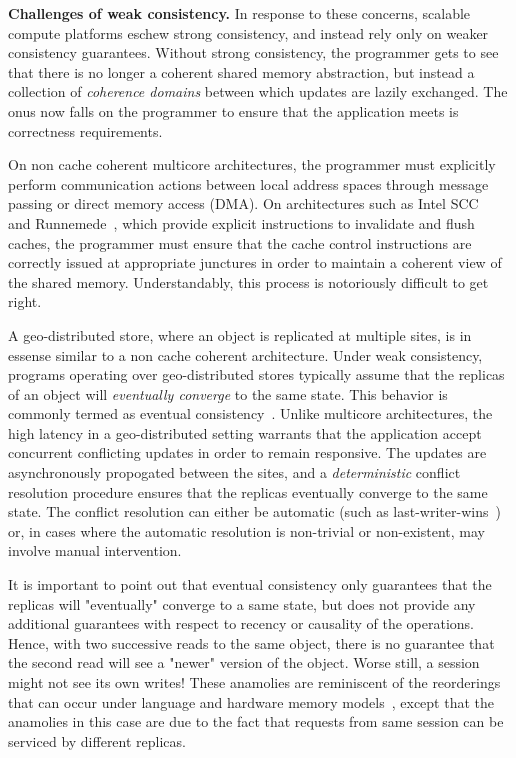\noindent \textbf{Challenges of weak consistency.} In response to these
concerns, scalable compute platforms eschew strong consistency, and instead
rely only on weaker consistency guarantees. Without strong consistency, the
programmer gets to see that there is no longer a coherent shared memory
abstraction, but instead a collection of \emph{coherence domains} between which
updates are lazily exchanged. The onus now falls on the programmer to ensure
that the application meets is correctness requirements.

On non cache coherent multicore architectures, the programmer must explicitly
perform communication actions between local address spaces through message
passing or direct memory access (DMA). On architectures such as Intel
SCC~\cite{Mattson2010} and Runnemede~\cite{Carter2013}, which provide explicit
instructions to invalidate and flush caches, the programmer must ensure that
the cache control instructions are correctly issued at appropriate junctures in
order to maintain a coherent view of the shared memory. Understandably, this
process is notoriously difficult to get right.

A geo-distributed store, where an object is replicated at multiple sites, is in
essense similar to a non cache coherent architecture. Under weak consistency,
programs operating over geo-distributed stores typically assume that the
replicas of an object will \emph{eventually converge} to the same state. This
behavior is commonly termed as eventual consistency~\cite{19,147,Conway}.
Unlike multicore architectures, the high latency in a geo-distributed setting
warrants that the application accept concurrent conflicting updates in order to
remain responsive. The updates are asynchronously propogated between the sites,
and a \emph{deterministic} conflict resolution procedure ensures that the
replicas eventually converge to the same state. The conflict resolution can
either be automatic (such as last-writer-wins~\cite{LWW}) or, in cases where
the automatic resolution is non-trivial or non-existent, may involve manual
intervention.

It is important to point out that eventual consistency only guarantees that the
replicas will "eventually" converge to a same state, but does not provide any
additional guarantees with respect to recency or causality of the operations.
Hence, with two successive reads to the same object, there is no guarantee that
the second read will see a "newer" version of the object. Worse still, a
session might not see its own writes! These anamolies are reminiscent of the
reorderings that can occur under language and hardware memory
models~\cite{Demange2013,Sewell2010}, except that the anamolies in this case
are due to the fact that requests from same session can be serviced by
different replicas.

